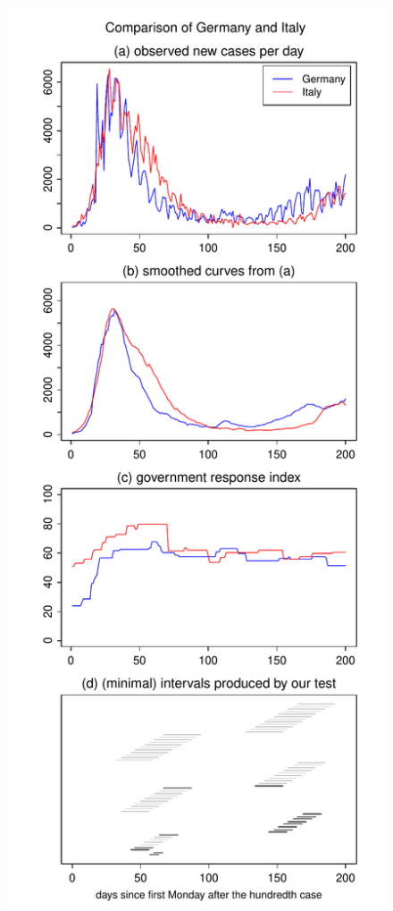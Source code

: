\documentclass[a4paper,12pt]{article}
\numberwithin{equation}{section}
\begin{document}
{\begin{figure}[h!]
\begin{minipage}[t]{0.49\textwidth}
\includegraphics[width=\textwidth]{plots/DEU_vs_ITA_four_countries}

\end{minipage}
\end{figure}}
\end{document}
